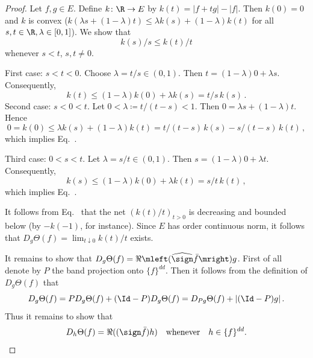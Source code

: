 \begin{proof}
Let $f, g \in E$. Define $k \colon \R \to E$ by $k(t) = |f+tg| - |f|$.
Then $k(0) = 0$ and $k$ is convex (\ie $k(\lambda s + (1-\lambda)t) \leq \lambda k(s) + (1-\lambda)k(t)$ for all $s, t \in \R, \lambda \in [0,1]$).
We show that
\begin{equation}\label{eq:c2-5.7}
k(s)/s \leq k(t)/t
\end{equation}
whenever $s < t$, $s,t \neq 0$.

First case: $s < t < 0$.
Choose $\lambda = t/s \in (0,1)$. 
Then $t = (1-\lambda)0 + \lambda s$. 
Consequently, 
\[
k(t) \leq (1-\lambda)k(0) + \lambda k(s) = t/s \, k(s)\,.
\]
Second case: $s < 0 < t$.
Let $0 < \lambda \coloneqq t/(t-s) < 1$. 
Then $0 = \lambda s + (1-\lambda)t$. 
Hence 
\[
0 = k(0) \leq \lambda k(s) + (1-\lambda)k(t) = t/(t-s) \, k(s) - s/(t-s) \, k(t)\,,
\]
which implies Eq.~.

Third case: $0 < s < t$.
Let $\lambda = s/t \in (0,1)$. Then $s = (1-\lambda)0 + \lambda t$. Consequently, 
\[
k(s) \leq (1-\lambda)k(0) + \lambda k(t) = s/t \, k(t)\,,
\]
which implies Eq.~.

It follows from Eq.~ that the net $(k(t)/t)_{t>0}$ is decreasing and bounded below (by $-k(-1)$, for instance). Since $E$ has order continuous norm, it follows that $\displaystyle D_{g}\Theta(f) = \lim_{t \downarrow 0} k(t)/t$ exists.

It remains to show that $D_{g}\Theta(f) = \Re\mleft(\widehat{\sign}  \bar{f}\mright)g$.
First of all denote by $P$ the band projection onto $\{f\}^{dd}$. Then it
follows from the definition of\/ $D_{g}\Theta(f)$ that 
\[
D_{g}\Theta(f) = PD_{g}\Theta(f) + (\Id-P)D_{g}\Theta(f) = D_{Pg}\Theta(f) + |(\Id-P)g|\,.
\]
Thus it remains to show that
\begin{equation}\label{eq:c2-5.8}
D_{h}\Theta(f) = \Re((\sign  \bar{f})h) \quad \text{whenever} \quad h \in \{f\}^{dd}.
\end{equation}


\end{proof}
